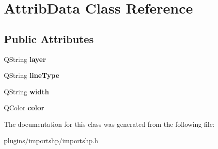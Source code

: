 \hypertarget{classAttribData}{\section{Attrib\-Data Class Reference}
\label{classAttribData}
}
\subsection*{Public Attributes}
\begin{DoxyCompactItemize}
\item 
\hypertarget{classAttribData_ac22a6360bbabf2a9234c9867b6881c5c}{Q\-String {\bfseries layer}}\label{classAttribData_ac22a6360bbabf2a9234c9867b6881c5c}

\item 
\hypertarget{classAttribData_aaa3220122c6b2f7628b57883a91553c3}{Q\-String {\bfseries line\-Type}}\label{classAttribData_aaa3220122c6b2f7628b57883a91553c3}

\item 
\hypertarget{classAttribData_a8565e4becce20099a8e30d3ad5f734c7}{Q\-String {\bfseries width}}\label{classAttribData_a8565e4becce20099a8e30d3ad5f734c7}

\item 
\hypertarget{classAttribData_a28fe9a49fa634f3d21e3c45a12d57a62}{Q\-Color {\bfseries color}}\label{classAttribData_a28fe9a49fa634f3d21e3c45a12d57a62}

\end{DoxyCompactItemize}


The documentation for this class was generated from the following file\-:\begin{DoxyCompactItemize}
\item 
plugins/importshp/importshp.\-h\end{DoxyCompactItemize}
